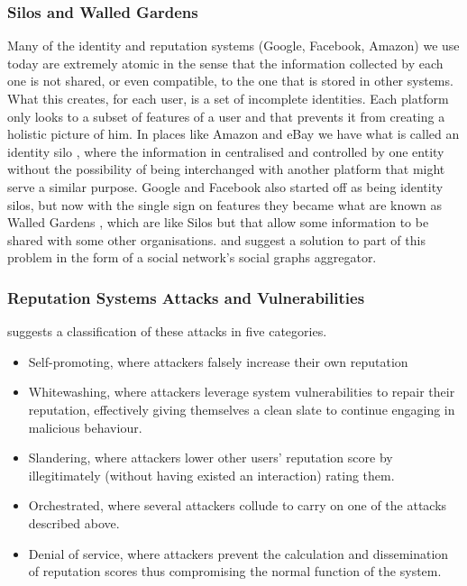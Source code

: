 \documentclass[llncsdoc]{llncs}
\begin{document}
\subsubsection{Silos and Walled Gardens}
Many of the identity and reputation systems (Google, Facebook, Amazon) we use today are extremely atomic in the sense that the information collected by each one is not shared, or even compatible, to the one that is stored in other systems. What this creates, for each user, is a set of incomplete identities. Each platform only looks to a subset of features of a user and that prevents it from creating a holistic picture of him. In places like Amazon and eBay we have what is called an identity silo \cite{Pato:2017uw}, where the information in centralised and controlled by one entity without the possibility of being interchanged with another platform that might serve a similar purpose. Google and Facebook also started off as being identity silos, but now with the single sign on features \cite{Anonymous:MGy1lR79} they became what are known as Walled Gardens \cite{Pato:2017uw}, which are like Silos but that allow some information to be shared with some other organisations. \cite{Anonymous:PvP3cFwB} and \cite{Mostarda:2009te} suggest a solution to part of this problem in the form of a social network's social graphs aggregator. 

\subsubsection{Reputation Systems Attacks and Vulnerabilities}
\cite{Hoffman:2009gm} suggests a classification of these attacks in five categories. 
\begin{itemize}
     

\item Self-promoting, where attackers falsely increase their own reputation
\item Whitewashing, where attackers leverage system vulnerabilities to repair their reputation, effectively giving themselves a clean slate to continue engaging in malicious behaviour.
\item Slandering, where attackers lower other users' reputation score by illegitimately (without having existed an interaction) rating them.
\item Orchestrated, where several attackers collude to carry on one of the attacks described above.
\item Denial of service, where attackers prevent the calculation and dissemination of reputation scores thus compromising the normal function of the system.
\end{itemize}
\end{document}
